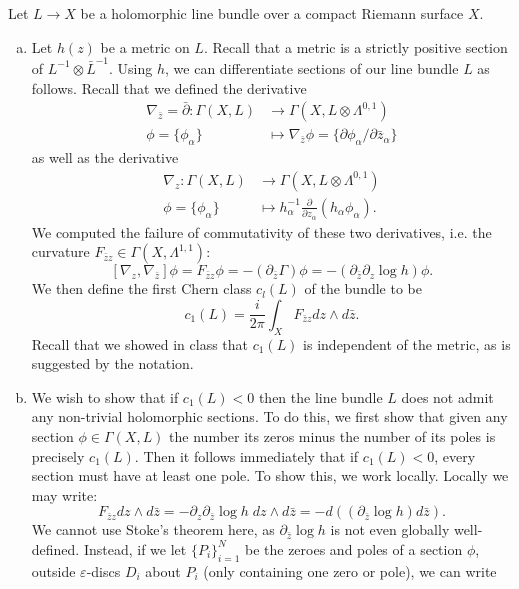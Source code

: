 \documentclass{../mathnotes}
\begin{document}
Let $L\to X$ be a holomorphic line bundle over a compact Riemann surface $X$.
\begin{enumerate}[(a)]
    \item Let $h(z)$ be a metric on $L$. Recall that a metric is a strictly positive section of $L^{-1}\otimes \bar L^{-1}$.
        Using $h$, we can differentiate sections of our line bundle $L$ as follows. 
        Recall that we defined the derivative
        \begin{align*}
            \nabla_{\bar z}=\bar\partial:\Gamma(X,L)&\to\Gamma(X,L\otimes\Lambda^{0,1})\\
            \phi=\{\phi_\alpha\}&\mapsto \nabla_{\bar z}\phi=\{\partial\phi_\alpha/\partial \bar z_\alpha\}
        \end{align*}
        as well as the derivative
        \begin{align*}
            \nabla_{z}:\Gamma(X,L)&\to\Gamma(X,L\otimes\Lambda^{0,1})\\
            \phi=\{\phi_\alpha\}&\mapsto h_\alpha^{-1}\frac{\partial}{\partial z_\alpha}(h_\alpha\phi_\alpha).
        \end{align*}
        We computed the failure of commutativity of these two derivatives, i.e. the curvature $F_{\bar zz}\in\Gamma(X,\Lambda^{1,1})$:
        \[ [\nabla_z,\nabla_{\bar z}]\phi=F_{\bar zz}\phi=-(\partial_{\bar z}\Gamma)\phi=-(\partial_{\bar z}\partial_z\log h)\phi. \]
        We then define the first Chern class $c_l(L)$ of the bundle to be
        \[ c_1(L)=\frac{i}{2\pi} \int_X F_{\bar z z} dz\wedge d\bar z.\]
        Recall that we showed in class that $c_1(L)$ is independent of the metric, as is suggested by the notation.
    \item We wish to show that if $c_1(L)<0$ then the line bundle $L$ does not admit any non-trivial holomorphic sections.
        To do this, we first show that given any section $\phi\in\Gamma(X,L)$ the number its zeros minus the number of its poles
        is precisely $c_1(L)$. Then it follows immediately that if $c_1(L)<0$, every section must have at least one pole. To show this,
        we work locally.  Locally we may write: 
        \[F_{\bar zz}dz\wedge d\bar z=-\partial_z\partial_{\bar z}\log h\; dz\wedge d\bar z=-d\left( (\partial_{\bar z}\log h)d\bar z \right).\]
        We cannot use Stoke's theorem here, as $\partial_{\bar z}\log h$ is not even globally well-defined. Instead, if we let $\{P_i\}_{i=1}^N$ be
        the zeroes and poles of a section $\phi$, outside $\varepsilon$-discs $D_i$ about $P_i$ (only containing one zero or pole), we can write

\end{enumerate}
\end{document}
